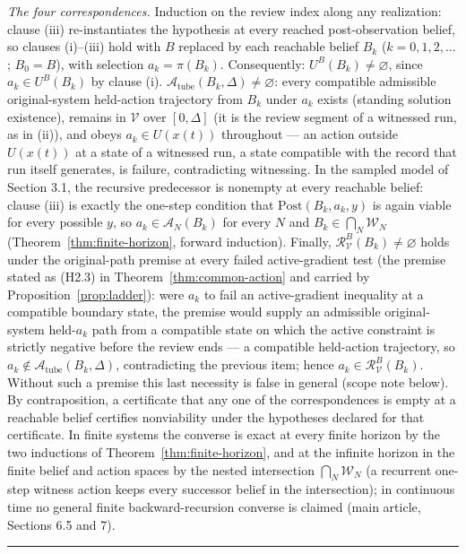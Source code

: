 \documentclass[11pt]{article}
\theoremstyle{definition}
\begin{document}
\emph{The four correspondences.} Induction on the review index along
any realization: clause (iii) re-instantiates the hypothesis at every
reached post-observation belief, so clauses (i)--(iii) hold with \(B\)
replaced by each reachable belief \(B_{k}\) (\(k = 0, 1, 2, \dots\);
\(B_{0} = B\)), with selection \(a_{k} = \pi(B_{k})\). Consequently:
\(U^{B}(B_{k}) \neq \varnothing\), since \(a_{k} \in U^{B}(B_{k})\) by
clause (i). \(\mathcal{A}_{\mathrm{tube}}(B_{k}, \Delta) \neq
\varnothing\): every compatible admissible original-system held-action
trajectory from \(B_{k}\) under \(a_{k}\) exists (standing solution
existence), remains in \(\mathcal{V}\) over \([0, \Delta]\) (it is the
review segment of a witnessed run, as in (ii)), and obeys \(a_{k} \in
U(x(t))\) throughout --- an action outside \(U(x(t))\) at a state of a
witnessed run, a state compatible with the record that run itself
generates, is failure, contradicting witnessing. In the sampled model
of Section 3.1, the recursive predecessor is nonempty at every
reachable belief: clause (iii) is exactly the one-step condition that
\(\mathrm{Post}(B_{k}, a_{k}, y)\) is again viable for every possible
\(y\), so \(a_{k} \in \mathcal{A}_{N}(B_{k})\) for every \(N\) and
\(B_{k} \in \bigcap_{N} \mathcal{W}_{N}\)
(Theorem~\ref{thm:finite-horizon}, forward induction). Finally,
\(\mathcal{R}_{\mathcal{V}}^{B}(B_{k}) \neq \varnothing\) holds under
the original-path premise at every failed active-gradient test (the
premise stated as (H2.3) in Theorem~\ref{thm:common-action} and
carried by Proposition~\ref{prop:ladder}): were \(a_{k}\) to fail an
active-gradient inequality at a compatible boundary state, the premise
would supply an admissible original-system held-\(a_{k}\) path from a
compatible state on which the active constraint is strictly negative
before the review ends --- a compatible held-action trajectory, so
\(a_{k} \notin \mathcal{A}_{\mathrm{tube}}(B_{k}, \Delta)\),
contradicting the previous item; hence \(a_{k} \in
\mathcal{R}_{\mathcal{V}}^{B}(B_{k})\). Without such a premise this
last necessity is false in general (scope note below). By
contraposition, a certificate that any one of the correspondences is
empty at a reachable belief certifies nonviability under the
hypotheses declared for that certificate. In finite systems the
converse is exact at every finite horizon by the two inductions of
Theorem~\ref{thm:finite-horizon}, and at the infinite horizon in the
finite belief and action spaces by the nested intersection
\(\bigcap_{N} \mathcal{W}_{N}\) (a recurrent one-step witness action
keeps every successor belief in the intersection); in continuous time
no general finite backward-recursion converse is claimed (main
article, Sections 6.5 and 7). \rule{0.5\linewidth}{0.5pt}
\end{document}
